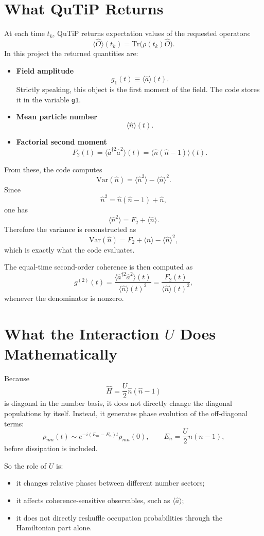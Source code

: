 \documentclass[12pt]{article}
\begin{document}
\section*{What QuTiP Returns}
At each time $t_k$, QuTiP returns expectation values of the requested operators:
\[
\langle \hat O \rangle(t_k) = \mathrm{Tr}\!\bigl(\rho(t_k)\hat O\bigr).
\]
In this project the returned quantities are:
\begin{itemize}
\item \textbf{Field amplitude}
\[
g_1(t) \equiv \langle \hat a \rangle(t).
\]
Strictly speaking, this object is the first moment of the field. The code stores it in the variable \texttt{g1}.
\item \textbf{Mean particle number}
\[
\langle \hat n \rangle(t).
\]
\item \textbf{Factorial second moment}
\[
F_2(t)=\langle \hat a^{\dagger 2}\hat a^2\rangle(t)=\langle \hat n(\hat n-1)\rangle(t).
\]
\end{itemize}

From these, the code computes
\[
\mathrm{Var}(\hat n)
= \langle \hat n^2\rangle - \langle \hat n\rangle^2.
\]
Since
\[
\hat n^2 = \hat n(\hat n-1)+\hat n,
\]
one has
\[
\langle \hat n^2\rangle = F_2 + \langle \hat n\rangle.
\]
Therefore the variance is reconstructed as
\[
\mathrm{Var}(\hat n)
= F_2 + \langle \hat n\rangle - \langle \hat n\rangle^2,
\]
which is exactly what the code evaluates.

The equal-time second-order coherence is then computed as
\[
g^{(2)}(t)
= \frac{\langle \hat a^{\dagger 2}\hat a^2\rangle(t)}{\langle \hat n\rangle(t)^2}
= \frac{F_2(t)}{\langle \hat n\rangle(t)^2},
\]
whenever the denominator is nonzero.

\section*{What the Interaction $U$ Does Mathematically}
Because
\[
\hat H = \frac{U}{2}\hat n(\hat n-1)
\]
is diagonal in the number basis, it does not directly change the diagonal populations by itself. Instead, it generates phase evolution of the off-diagonal terms:
\[
\rho_{mn}(t)
\sim
e^{-i(E_m-E_n)t}\rho_{mn}(0),
\qquad
E_n = \frac{U}{2}n(n-1),
\]
before dissipation is included.

So the role of $U$ is:
\begin{itemize}
\item it changes relative phases between different number sectors;
\item it affects coherence-sensitive observables, such as $\langle \hat a\rangle$;
\item it does not directly reshuffle occupation probabilities through the Hamiltonian part alone.
\end{itemize}
\end{document}
